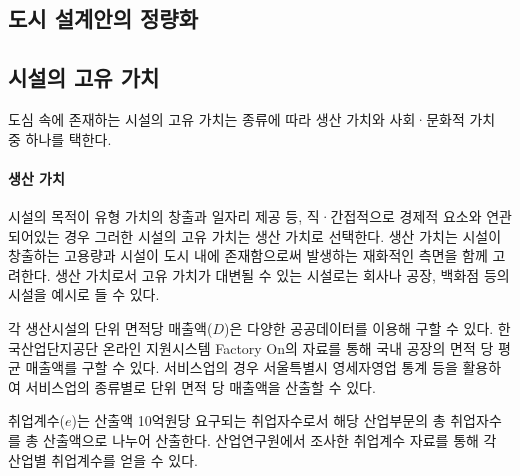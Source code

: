 \documentclass[10pt]{article}
\begin{document}
\begin{multicols}{2}


 \section{도시 설계안의 정량화}
 
 \subsection{시설의 고유 가치}
 도심 속에 존재하는 시설의 고유 가치는 종류에 따라 생산 가치와 사회·문화적 가치 중 하나를 택한다.
\vspace*{-1ex}
\paragraph{생산 가치}

시설의 목적이 유형 가치의 창출과 일자리 제공 등, 직·간접적으로 경제적 요소와 연관 되어있는 경우 그러한 시설의 고유 가치는 생산 가치로 선택한다. 생산 가치는 시설이 창출하는 고용량과 시설이 도시 내에 존재함으로써 발생하는 재화적인 측면을 함께 고려한다. 생산 가치로서 고유 가치가 대변될 수 있는 시설로는 회사나 공장, 백화점 등의 시설을 예시로 들 수 있다.

각 생산시설의 단위 면적당 매출액($D$)은 다양한 공공데이터를 이용해 구할 수 있다. 한국산업단지공단 온라인 지원시스템 Factory On의 자료를 통해 국내 공장의 면적 당 평균 매출액를 구할 수 있다\cite{충남연구원2015}. 서비스업의 경우 서울특별시 영세자영업 통계 등을 활용하여 서비스업의 종류별로 단위 면적 당 매출액을 산출할 수 있다\cite{seoul_opendata_2022}.

취업계수($e$)는 산출액 10억원당 요구되는 취업자수로서 해당 산업부문의 총 취업자수를 총
산출액으로 나누어 산출한다.\cite{ISTANS} 산업연구원에서 조사한 취업계수 자료를 통해 각 산업별 취업계수를 얻을 수 있다.


\end{multicols}
\end{document}
